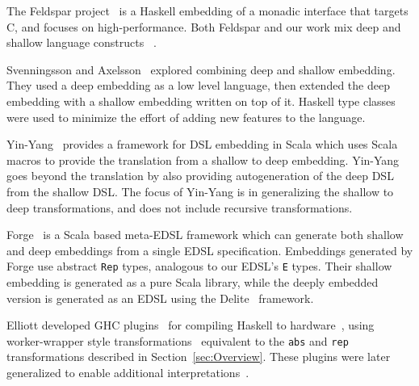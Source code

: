 \documentclass[sigplan,anonymous,review]{acmart}
\begin{document}
The Feldspar project~\cite{Axelsson:10:Feldspar,Svenningsson:13:Combining}
is a Haskell embedding of a monadic interface
that targets C, and focuses on high-performance.  Both Feldspar and our work
mix deep and shallow language constructs ~\cite{Persson:11:MonadicDSL,Svenningsson:13:Compositional,Sculthorpe:13:ConstrainedMonad}.

Svenningsson and Axelsson~\cite{Svenningsson:13:Combining}
explored combining deep and shallow embedding.  They used
a deep embedding as a low level language, then extended
the deep embedding with a shallow embedding written on top
of it. Haskell type classes were used to minimize the effort of adding
new features to the language.

Yin-Yang~\cite{Jovanovic:2014} provides a framework for DSL
embedding in Scala which uses Scala macros to provide the 
translation from a shallow to deep embedding.  Yin-Yang
goes beyond the translation by also providing autogeneration
of the deep DSL from the shallow DSL.  The focus of
Yin-Yang is in generalizing the shallow to deep transformations,
and does not include recursive transformations.

Forge~\cite{Sujeeth:2013} is a Scala based meta-EDSL framework
which can generate both shallow and deep embeddings from
a single EDSL specification.  Embeddings generated by Forge
use abstract \verb|Rep| types, analogous to our EDSL's 
\verb|E| types.  Their shallow embedding is generated
as a pure Scala library, while the deeply embedded version
is generated as an EDSL using the Delite~\cite{Sujeeth:2014}
framework.

Elliott developed GHC plugins~\cite{github:lambda-ccc}\cite{github:reification-rules}
for compiling Haskell to hardware~\cite{github:Elliott:Talk:2015},
using worker-wrapper style transformations~\cite{Gill:09:WW}
equivalent to the \verb|abs| and
\verb|rep| transformations described in Section~\ref{sec:Overview}. These plugins were later generalized to enable additional interpretations~\cite{Elliott:2017}.





\appendix
\end{document}
